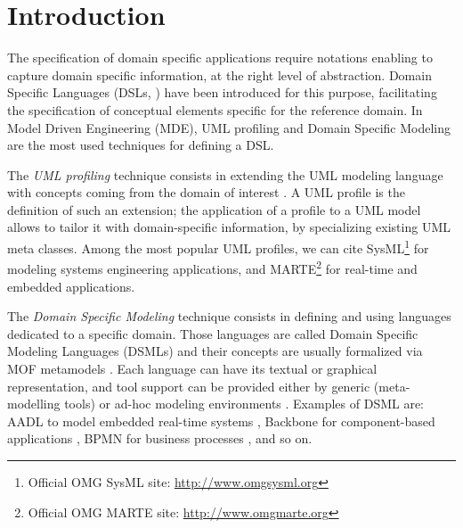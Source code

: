 \section{Introduction}\label{sec:intro}

The specification of domain specific applications require notations enabling to capture domain specific information, at the right level of abstraction. Domain Specific Languages (DSLs, \cite{FowlerBook}) have been introduced for this purpose, facilitating the specification of conceptual elements specific for the reference domain. In Model Driven Engineering (MDE), UML profiling \cite{UML} and Domain Specific Modeling \cite{DSML} are the most used techniques for defining a DSL.

The \textit{UML profiling} technique consists in extending the UML modeling language with concepts coming from
the domain of interest \cite{UMLprofile}.
A UML profile is the definition of such an extension; the application of a profile to a UML model allows to tailor it with domain-specific information, by specializing existing UML meta classes. Among the most popular UML profiles, we can cite SysML\footnote{Official OMG SysML site: \small{\url{http://www.omgsysml.org}}}
for modeling systems engineering applications, and 
MARTE\footnote{Official OMG MARTE site: \small{\url{http://www.omgmarte.org}}} for real-time and embedded applications. 

The \textit{Domain Specific Modeling} technique consists in defining and using languages dedicated to a specific domain.
Those languages are called Domain Specific Modeling Languages (DSMLs) and their concepts are usually formalized  via MOF metamodels \cite{MOF}.
Each language can have its textual or graphical representation, and tool support can be provided either by generic (meta-modelling tools) or
ad-hoc modeling environments \cite{DSML}.
Examples of DSML are: AADL to model embedded real-time systems \cite{aadl}, Backbone for component-based applications \cite{backbone}, 
BPMN for business processes \cite{BPMN}, and so on.

